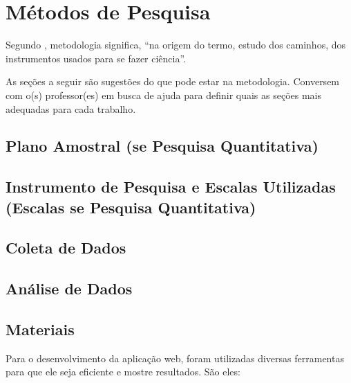 \documentclass[
	article,			%
	12pt,				%
	oneside,			%
	a4paper,			%
    BIBLATEX,           %
	english,			%
	brazil,				%
	sumario=tradicional
	]{abntex2}
\begin{document}
\section{Métodos de Pesquisa}

Segundo , metodologia significa, “na origem do termo, estudo dos caminhos, dos instrumentos usados para se fazer ciência”.

As seções a seguir são sugestões do que pode estar na metodologia. Conversem com o(s) professor(es) em busca de ajuda para definir quais as seções mais adequadas para cada trabalho.

\subsection{Plano Amostral (se Pesquisa Quantitativa)}

\subsection{Instrumento de Pesquisa e Escalas Utilizadas (Escalas se Pesquisa Quantitativa)}

\subsection{Coleta de Dados}

\subsection{Análise de Dados}

\subsection{Materiais}

Para o desenvolvimento da aplicação web, foram utilizadas diversas ferramentas para que ele seja eficiente e mostre resultados. São eles:
\end{document}
